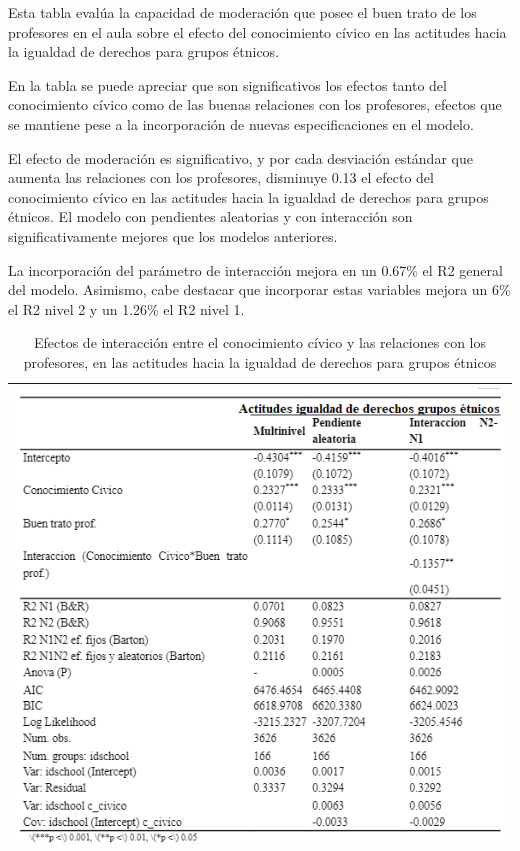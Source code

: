 \documentclass[12pt,twoside]{templates/facsothesis}
\begin{document}
Esta tabla evalúa la capacidad de moderación que posee el buen trato de los profesores en el aula sobre el efecto del conocimiento cívico en las actitudes hacia la igualdad de derechos para grupos étnicos.

En la tabla se puede apreciar que son significativos los efectos tanto del conocimiento cívico como de las buenas relaciones con los profesores, efectos que se mantiene pese a la incorporación de nuevas especificaciones en el modelo.

El efecto de moderación es significativo, y por cada desviación estándar que aumenta las relaciones con los profesores, disminuye 0.13 el efecto del conocimiento cívico en las actitudes hacia la igualdad de derechos para grupos étnicos. El modelo con pendientes aleatorias y con interacción son significativamente mejores que los modelos anteriores.

La incorporación del parámetro de interacción mejora en un 0.67\% el R2 general del modelo. Asimismo, cabe destacar que incorporar estas variables mejora un 6\% el R2 nivel 2 y un 1.26\% el R2 nivel 1.

\begin{longtable}[]{@{}l@{}}
\caption{\label{tab:unnamed-chunk-16}Efectos de interacción entre el conocimiento cívico y las relaciones con los profesores, en las actitudes hacia la igualdad de derechos para grupos étnicos}\tabularnewline
\toprule
\endhead
\includegraphics[width=\textwidth,height=0.7\textheight]{input/images/INTERACCION4.png} \\
\bottomrule
\end{longtable}
\end{document}

